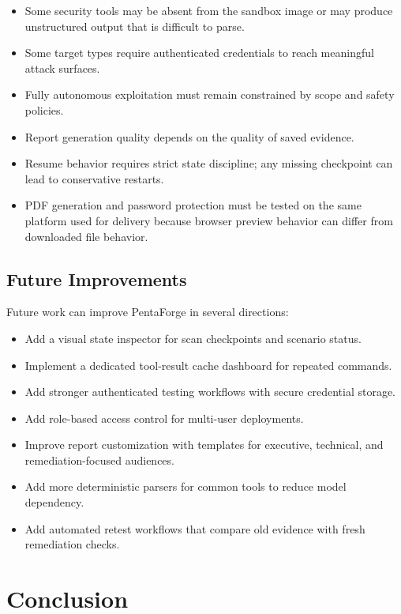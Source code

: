 \documentclass[12pt,a4paper]{report}
\begin{document}
\begin{itemize}
    \item Some security tools may be absent from the sandbox image or may produce
    unstructured output that is difficult to parse.
    \item Some target types require authenticated credentials to reach meaningful
    attack surfaces.
    \item Fully autonomous exploitation must remain constrained by scope and safety
    policies.
    \item Report generation quality depends on the quality of saved evidence.
    \item Resume behavior requires strict state discipline; any missing checkpoint can
    lead to conservative restarts.
    \item PDF generation and password protection must be tested on the same platform
    used for delivery because browser preview behavior can differ from downloaded file
    behavior.
\end{itemize}

\subsection{Future Improvements}

Future work can improve PentaForge in several directions:

\begin{itemize}
    \item Add a visual state inspector for scan checkpoints and scenario status.
    \item Implement a dedicated tool-result cache dashboard for repeated commands.
    \item Add stronger authenticated testing workflows with secure credential storage.
    \item Add role-based access control for multi-user deployments.
    \item Improve report customization with templates for executive, technical, and
    remediation-focused audiences.
    \item Add more deterministic parsers for common tools to reduce model dependency.
    \item Add automated retest workflows that compare old evidence with fresh
    remediation checks.
\end{itemize}

\section*{Conclusion}
\end{document}
